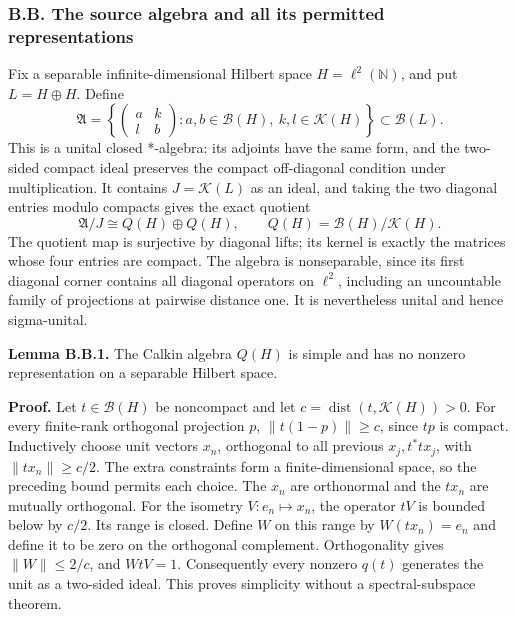 \documentclass[
  11pt,
]{article}
\begin{document}
\subsubsection{B.B. The source algebra and all its permitted
representations}\label{b.b.-the-source-algebra-and-all-its-permitted-representations}

Fix a separable infinite-dimensional Hilbert space
\(H=\ell^2(\mathbb N)\), and put \(L=H\oplus H\). Define \[
\mathfrak A=
\left\{\begin{pmatrix}a&k\\l&b\end{pmatrix}:
a,b\in\mathcal B(H),\ k,l\in\mathcal K(H)\right\}
\subset\mathcal B(L).
\tag{B.B.1}
\] This is a unital closed *-algebra: its adjoints have the same form,
and the two-sided compact ideal preserves the compact off-diagonal
condition under multiplication. It contains \(J=\mathcal K(L)\) as an
ideal, and taking the two diagonal entries modulo compacts gives the
exact quotient \[
\mathfrak A/J\cong Q(H)\oplus Q(H),\qquad
Q(H)=\mathcal B(H)/\mathcal K(H).
\tag{B.B.2}
\] The quotient map is surjective by diagonal lifts; its kernel is
exactly the matrices whose four entries are compact. The algebra is
nonseparable, since its first diagonal corner contains all diagonal
operators on \(\ell^2\), including an uncountable family of projections
at pairwise distance one. It is nevertheless unital and hence
sigma-unital.

\textbf{Lemma B.B.1.} The Calkin algebra \(Q(H)\) is simple and has no
nonzero representation on a separable Hilbert space.

\textbf{Proof.} Let \(t\in\mathcal B(H)\) be noncompact and let
\(c=\operatorname{dist}(t,\mathcal K(H))>0\). For every finite-rank
orthogonal projection \(p\), \(\|t(1-p)\|\ge c\), since \(tp\) is
compact. Inductively choose unit vectors \(x_n\), orthogonal to all
previous \(x_j,t^*t x_j\), with \(\|tx_n\|\ge c/2\). The extra
constraints form a finite-dimensional space, so the preceding bound
permits each choice. The \(x_n\) are orthonormal and the \(tx_n\) are
mutually orthogonal. For the isometry \(V:e_n\mapsto x_n\), the operator
\(tV\) is bounded below by \(c/2\). Its range is closed. Define \(W\) on
this range by \(W(tx_n)=e_n\) and define it to be zero on the orthogonal
complement. Orthogonality gives \(\|W\|\le2/c\), and \(WtV=1\).
Consequently every nonzero \(q(t)\) generates the unit as a two-sided
ideal. This proves simplicity without a spectral-subspace theorem.
\end{document}

